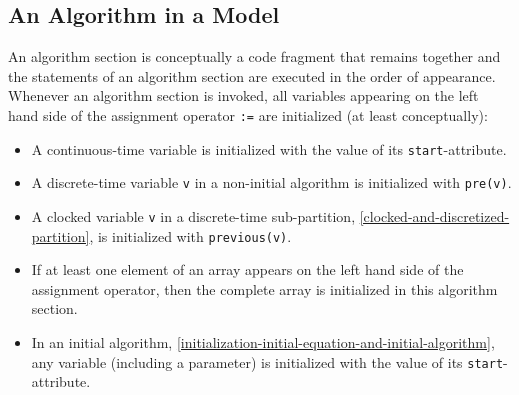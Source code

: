 \subsection{An Algorithm in a Model}\label{execution-of-an-algorithm-in-a-model}\label{an-algorithm-in-a-model}

An algorithm section is conceptually a code fragment that remains together and the statements of an algorithm section are executed in the order of appearance.
Whenever an algorithm section is invoked, all variables appearing on the left hand side of the assignment operator \lstinline!:=! are initialized (at least conceptually):
\begin{itemize}
\item
  A continuous-time variable is initialized with the value of its \lstinline!start!-attribute.
\item
  A discrete-time variable \lstinline!v! in a non-initial algorithm is initialized with \lstinline!pre(v)!.
\item
  A clocked variable \lstinline!v! in a discrete-time sub-partition, \cref{clocked-and-discretized-partition}, is initialized with \lstinline!previous(v)!.
\item
  If at least one element of an array appears on the left hand side of the assignment operator, then the complete array is initialized in this algorithm section.
\item
  In an initial algorithm, \cref{initialization-initial-equation-and-initial-algorithm}, any variable (including a parameter) is initialized with the value of its \lstinline!start!-attribute.
\end{itemize}

